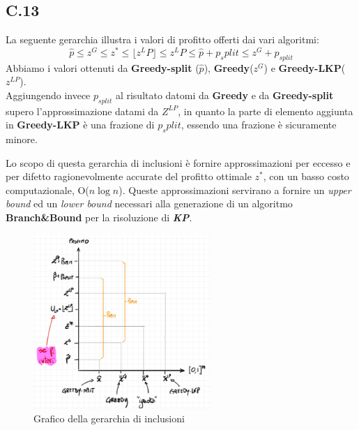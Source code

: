 \documentclass[a4paper]{article}
\newcommand{\imp}[1]{\textbf{\textit{#1}}}
\begin{document}
\subsection{C.13}
\label{SEC:C.13}
La seguente gerarchia illustra i valori di profitto offerti dai vari algoritmi:
$$\hat p \leq z^G \leq z^* \leq \lfloor z^LP \rfloor  \leq z^LP \leq \hat p + p_split \leq z^G + p_{split}$$
Abbiamo i valori ottenuti da \textbf{Greedy-split} ($\hat p$), \textbf{Greedy}($z^G$) e \textbf{Greedy-LKP}($z^{LP}$).\\
Aggiungendo invece $p_{split}$ al risultato datomi da \textbf{Greedy} e da \textbf{Greedy-split} supero l'approssimazione datami da $Z^{LP}$, in quanto la parte di elemento aggiunta in \textbf{Greedy-LKP} è una frazione di $p_split$, essendo una frazione è sicuramente minore.

Lo scopo di questa gerarchia di inclusioni è fornire approssimazioni per eccesso e per difetto ragionevolmente accurate del profitto ottimale $z^*$, con un basso costo computazionale, O($n\log n$).
Queste approssimazioni servirano a fornire un \textit{upper bound} ed un \textit{lower bound} necessari alla generazione di un algoritmo \textbf{Branch\&Bound} per la risoluzione di \imp{KP}.\\
\begin{figure}[!ht]
\centering
\includegraphics[width=0.6\textwidth]{./img/C_13.png}
\caption{Grafico della gerarchia di inclusioni} \label{FIG:C_13}
\end{figure}\\
\end{document}
